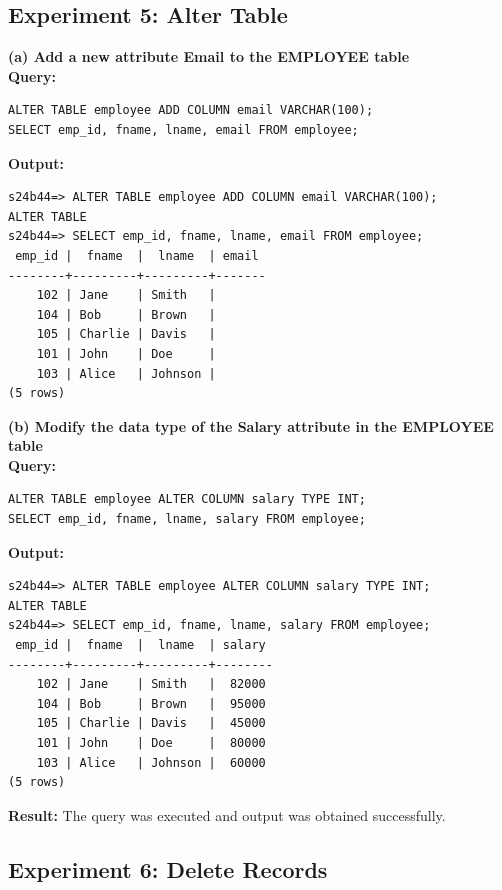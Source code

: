\documentclass[12pt, a4paper]{article}
\begin{document}
\newpage
\subsection*{Experiment 5: Alter Table}

\textbf{(a) Add a new attribute Email to the EMPLOYEE table}\\
\textbf{Query:}
\begin{lstlisting}
ALTER TABLE employee ADD COLUMN email VARCHAR(100);
SELECT emp_id, fname, lname, email FROM employee;
\end{lstlisting}
\textbf{Output:}
\begin{lstlisting}[style=terminal]
s24b44=> ALTER TABLE employee ADD COLUMN email VARCHAR(100);
ALTER TABLE
s24b44=> SELECT emp_id, fname, lname, email FROM employee;
 emp_id |  fname  |  lname  | email 
--------+---------+---------+-------
    102 | Jane    | Smith   | 
    104 | Bob     | Brown   | 
    105 | Charlie | Davis   | 
    101 | John    | Doe     | 
    103 | Alice   | Johnson | 
(5 rows)
\end{lstlisting}

\textbf{(b) Modify the data type of the Salary attribute in the EMPLOYEE table}\\
\textbf{Query:}
\begin{lstlisting}
ALTER TABLE employee ALTER COLUMN salary TYPE INT;
SELECT emp_id, fname, lname, salary FROM employee;
\end{lstlisting}
\textbf{Output:}
\begin{lstlisting}[style=terminal]
s24b44=> ALTER TABLE employee ALTER COLUMN salary TYPE INT;
ALTER TABLE
s24b44=> SELECT emp_id, fname, lname, salary FROM employee;
 emp_id |  fname  |  lname  | salary 
--------+---------+---------+--------
    102 | Jane    | Smith   |  82000
    104 | Bob     | Brown   |  95000
    105 | Charlie | Davis   |  45000
    101 | John    | Doe     |  80000
    103 | Alice   | Johnson |  60000
(5 rows)
\end{lstlisting}
\textbf{Result:} The query was executed and output was obtained successfully.


\newpage
\subsection*{Experiment 6: Delete Records}
\end{document}
